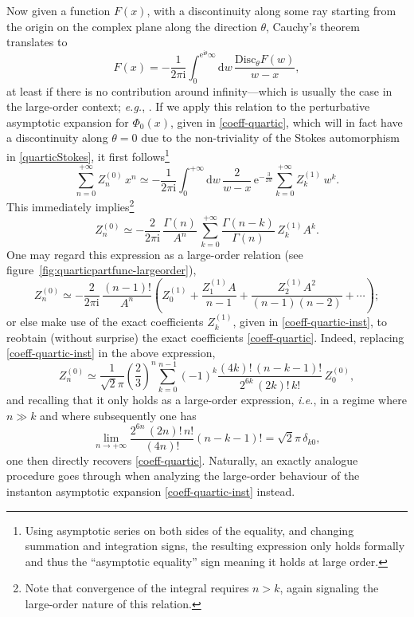 \documentclass[11pt,a4paper]{article}
\newcommand{\be}{\begin{equation}}
\newcommand{\ee}{\end{equation}}
\def\disc{{\mathrm{Disc}}}
\newcommand{\rme}{{\mathrm{e}}}
\newcommand{\rmi}{{\mathrm{i}}}
\newcommand{\rmd}{{\mathrm{d}}}
\begin{document}
Now given a function $F(x)$, with a discontinuity along some ray starting from the origin on the complex plane along the direction $\theta$, Cauchy's theorem translates to 
%
\be
F(x) = - \frac{1}{2\pi\rmi} \int_{0}^{\rme^{\rmi\theta} \infty} \rmd w\, \frac{\disc_\theta F(w)}{w-x},
\ee
%
\noindent
at least if there is no contribution around infinity---which is usually the case in the large-order context; \textit{e.g.}, \cite{bw69, bw73, cs78, z81b}. If we apply this relation to the perturbative asymptotic expansion for $\Phi_0 (x)$, given in \eqref{coeff-quartic}, which will in fact have a discontinuity along $\theta=0$ due to the non-triviality of the Stokes automorphism in \eqref{quarticStokes}, it first follows\footnote{Using asymptotic series on both sides of the equality, and changing summation and integration signs, the resulting expression only holds formally and thus the ``asymptotic equality'' sign meaning it holds at large order.}
%
\be
\sum_{n=0}^{+\infty} Z^{(0)}_n\, x^n \simeq -\frac{1}{2\pi\rmi} \int_{0}^{+ \infty} \rmd w\, \frac{2}{w-x}\, \rme^{-\frac{3}{2w}} \sum_{k=0}^{+\infty} Z^{(1)}_k\, w^k.
\ee
%
\noindent
This immediately implies\footnote{Note that convergence of the integral requires $n>k$, again signaling the large-order nature of this relation.}
%
\be
Z^{(0)}_n \simeq -\frac{2}{2\pi\rmi}\, \frac{\Gamma\left(n\right)}{A^n}\, \sum_{k=0}^{+\infty} \frac{\Gamma\left(n-k\right)}{\Gamma\left(n\right)}\, Z^{(1)}_k A^k.
\ee
%
\noindent
One may regard this expression as a large-order relation (see figure~\ref{fig:quarticpartfunc-largeorder}),
%
\be
\label{Z0largeorder}
Z^{(0)}_n \simeq -\frac{2}{2\pi\rmi}\, \frac{\left(n-1\right)!}{A^n} \left( Z^{(1)}_0 + \frac{Z^{(1)}_1 A}{n-1} + \frac{Z^{(1)}_2 A^2}{\left( n-1 \right) \left( n-2 \right)} + \cdots \right);
\ee
%
\noindent
or else make use of the exact coefficients $Z^{(1)}_k$, given in \eqref{coeff-quartic-inst}, to reobtain (without surprise) the exact coefficients \eqref{coeff-quartic}. Indeed, replacing \eqref{coeff-quartic-inst} in the above expression,
%
\be
Z^{(0)}_n \simeq \frac{1}{\sqrt{2}\pi} \left( \frac{2}{3} \right)^n \sum_{k=0}^{n-1} (-1)^k \frac{(4k)!\, (n-k-1)!}{2^{6k}\, (2k)!\, k!}\, Z^{(0)}_0,
\ee
%
\noindent
and recalling that it only holds as a large-order expression, \textit{i.e.}, in a regime where $n \gg k$ and where subsequently one has
%
\be
\lim_{n \to +\infty} \frac{2^{6n}\, (2n)!\, n!}{(4n)!} \left(n-k-1\right)! = \sqrt{2}\pi\, \delta_{k0},
\ee
%
\noindent
one then directly recovers \eqref{coeff-quartic}. Naturally, an exactly analogue procedure goes through when analyzing the large-order behaviour of the instanton asymptotic expansion \eqref{coeff-quartic-inst} instead.
\end{document}
